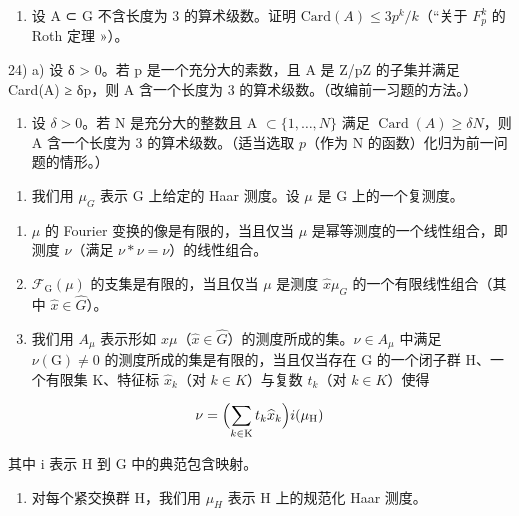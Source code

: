 \begin{enumerate}
\def\labelenumi{\alph{enumi})}
\setcounter{enumi}{4}
\tightlist
\item
  设 A ⊂ G 不含长度为 3 的算术级数。证明 \(\text{Card}(A) \leqslant 3p^{k}/k\)（“关于 \(F_{p}^{k}\) 的 Roth 定理 »）。
\end{enumerate}

24) a) 设 δ \textgreater{} 0。若 p 是一个充分大的素数，且 A 是 Z/pZ 的子集并满足 Card(A) ≥ δp，则 A 含一个长度为 3 的算术级数。（改编前一习题的方法。）

\begin{enumerate}
\def\labelenumi{\alph{enumi})}
\setcounter{enumi}{1}
\tightlist
\item
  设 \(\delta > 0\)。若 N 是充分大的整数且 A \(\subset \{1, \ldots, N\}\) 满足 \(\operatorname{Card}(A) \geqslant \delta N\)，则 A 含一个长度为 3 的算术级数。（适当选取 \(p\)（作为 N 的函数）化归为前一问题的情形。）
\end{enumerate}

\begin{enumerate}
\def\labelenumi{\arabic{enumi})}
\setcounter{enumi}{24}
\tightlist
\item
  我们用 \(\mu_{G}\) 表示 G 上给定的 Haar 测度。设 \(\mu\) 是 G 上的一个复测度。
\end{enumerate}

\begin{enumerate}
\def\labelenumi{\alph{enumi})}
\item
  \(\mu\) 的 Fourier 变换的像是有限的，当且仅当 \(\mu\) 是幂等测度的一个线性组合，即测度 \(\nu\)（满足 \(\nu * \nu = \nu\)）的线性组合。
\item
  \(\mathcal{F}_{\mathrm{G}}(\mu)\) 的支集是有限的，当且仅当 \(\mu\) 是测度 \(\widehat{x}\mu_{G}\) 的一个有限线性组合（其中 \(\widehat{x} \in \widehat{G}\)）。
\item
  我们用 \(A_{\mu}\) 表示形如 \(\widehat{x}\mu\)（\(\widehat{x}\in\widehat{G}\)）的测度所成的集。\(\nu\in A_{\mu}\) 中满足 \(\nu(\mathrm{G})\neq0\) 的测度所成的集是有限的，当且仅当存在 G 的一个闭子群 H、一个有限集 K、特征标 \(\widehat{x}_{k}\)（对 \(k\in K\)）与复数 \(t_{k}\)（对 \(k\in K\)）使得
\end{enumerate}

\[
\nu = \Bigl (\sum_ {k \in \mathrm{K}} t _ {k} \widehat {x} _ {k} \Bigr) i (\mu_ {\mathrm{H}})
\]

其中 i 表示 H 到 G 中的典范包含映射。

\begin{enumerate}
\def\labelenumi{\arabic{enumi})}
\setcounter{enumi}{25}
\tightlist
\item
对每个紧交换群 H，我们用 \(\mu_{H}\) 表示 H 上的规范化 Haar 测度。
\end{enumerate}

